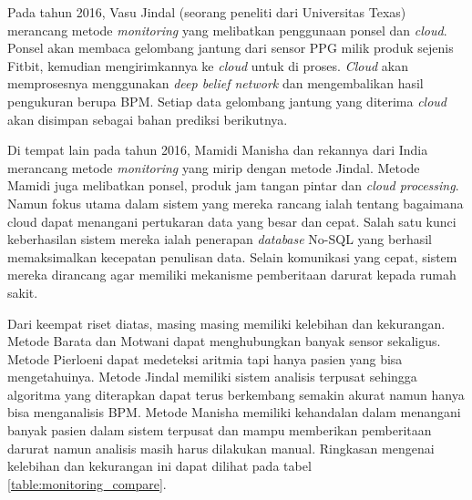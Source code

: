 Pada tahun 2016, Vasu Jindal (seorang peneliti dari Universitas Texas) merancang metode \textit{monitoring} yang melibatkan penggunaan ponsel dan \textit{cloud}\cite{vasu_jindal}. Ponsel akan membaca gelombang jantung dari sensor PPG milik produk sejenis Fitbit, kemudian mengirimkannya ke \textit{cloud} untuk di proses. \textit{Cloud} akan memprosesnya menggunakan \textit{deep belief network} dan mengembalikan hasil pengukuran berupa BPM. Setiap data gelombang jantung yang diterima \textit{cloud} akan disimpan sebagai bahan prediksi berikutnya.

Di tempat lain pada tahun 2016, Mamidi Manisha dan rekannya dari India merancang metode \textit{monitoring} yang mirip dengan metode Jindal. Metode Mamidi juga melibatkan ponsel, produk jam tangan pintar \cite{mamidi} dan \textit{cloud processing}. Namun fokus utama dalam sistem yang mereka rancang ialah tentang bagaimana cloud dapat menangani pertukaran data yang besar dan cepat. Salah satu kunci keberhasilan sistem mereka ialah penerapan \textit{database} No-SQL yang berhasil memaksimalkan kecepatan penulisan data. Selain komunikasi yang cepat, sistem mereka dirancang agar memiliki mekanisme pemberitaan darurat kepada rumah sakit.

Dari keempat riset diatas, masing masing memiliki kelebihan dan kekurangan. Metode Barata dan Motwani dapat menghubungkan banyak sensor sekaligus. Metode Pierloeni dapat medeteksi aritmia tapi hanya pasien yang bisa mengetahuinya. Metode Jindal memiliki sistem analisis terpusat sehingga algoritma yang diterapkan dapat terus berkembang semakin akurat namun hanya bisa menganalisis BPM. Metode Manisha memiliki kehandalan dalam menangani banyak pasien dalam sistem terpusat dan mampu memberikan pemberitaan darurat namun analisis masih harus dilakukan manual. Ringkasan mengenai kelebihan dan kekurangan ini dapat dilihat pada tabel \ref{table:monitoring_compare}.

